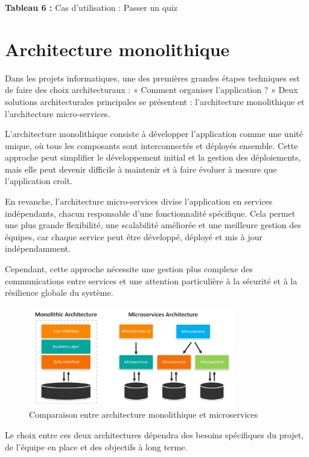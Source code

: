 \documentclass[12pt,a4paper]{report}
\begin{document}
\begin{center}
\textbf{Tableau 6 :} Cas d'utilisation : Passer un quiz
\end{center}

\section{Architecture monolithique}

Dans les projets informatiques, une des premières grandes étapes techniques est de faire des choix architecturaux : « Comment organiser l'application ? » Deux solutions architecturales principales se présentent : l'architecture monolithique et l'architecture micro-services.

L'architecture monolithique consiste à développer l'application comme une unité unique, où tous les composants sont interconnectés et déployés ensemble. Cette approche peut simplifier le développement initial et la gestion des déploiements, mais elle peut devenir difficile à maintenir et à faire évoluer à mesure que l'application croît.

En revanche, l'architecture micro-services divise l'application en services indépendants, chacun responsable d'une fonctionnalité spécifique. Cela permet une plus grande flexibilité, une scalabilité améliorée et une meilleure gestion des équipes, car chaque service peut être développé, déployé et mis à jour indépendamment.

Cependant, cette approche nécessite une gestion plus complexe des communications entre services et une attention particulière à la sécurité et à la résilience globale du système.

\begin{figure}[H]
\centering
\includegraphics[width=0.8\textwidth]{latex_media/media/image15.jpeg}
\caption{Comparaison entre architecture monolithique et microservices}
\label{fig:comparaison-architectures}
\end{figure}

Le choix entre ces deux architectures dépendra des besoins spécifiques du projet, de l'équipe en place et des objectifs à long terme.
\end{document}
